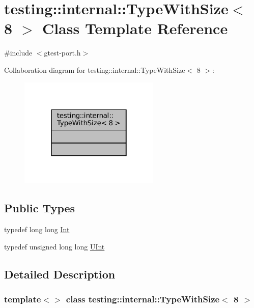 \hypertarget{classtesting_1_1internal_1_1TypeWithSize_3_018_01_4}{}\section{testing\+:\+:internal\+:\+:Type\+With\+Size$<$ 8 $>$ Class Template Reference}
\label{classtesting_1_1internal_1_1TypeWithSize_3_018_01_4}


{\ttfamily \#include $<$gtest-\/port.\+h$>$}



Collaboration diagram for testing\+:\+:internal\+:\+:Type\+With\+Size$<$ 8 $>$\+:
\nopagebreak
\begin{figure}[H]
\begin{center}
\leavevmode
\includegraphics[width=190pt]{classtesting_1_1internal_1_1TypeWithSize_3_018_01_4__coll__graph}
\end{center}
\end{figure}
\subsection*{Public Types}
\begin{DoxyCompactItemize}
\item 
typedef long long \hyperlink{classtesting_1_1internal_1_1TypeWithSize_3_018_01_4_a36d5697e5f5254b0495f13c97d747e36}{Int}
\item 
typedef unsigned long long \hyperlink{classtesting_1_1internal_1_1TypeWithSize_3_018_01_4_a747e21c5aee8faf07ec65cd4c3d1ca62}{U\+Int}
\end{DoxyCompactItemize}


\subsection{Detailed Description}
\subsubsection*{template$<$$>$\newline
class testing\+::internal\+::\+Type\+With\+Size$<$ 8 $>$}



